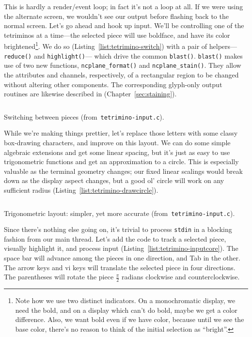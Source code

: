 This is hardly a render/event loop; in fact it's not a loop at all. If we were
using the alternate screen, we wouldn't see our output before flashing back to
the normal screen. Let's go ahead and hook up input. We'll be controlling one
of the tetriminos at a time---the selected piece will use boldface, and have its
color brightened\footnote{Note how we use two distinct indicators. On a monochromatic
display, we need the bold, and on a display which can't do bold, maybe we get a
color difference. Also, we want bold even if we have color, because until we
see the base color, there's no reason to think of the initial selection as
``bright''.}. We do so (Listing~\ref{list:tetrimino-switch}) with a pair of
helpers---\texttt{reduce()} and \texttt{highlight()}--- which drive the common
\texttt{blast()}. \texttt{blast()} makes use of two new functions,
\texttt{ncplane\_format()} and \texttt{ncplane\_stain()}. They allow the
attributes and channels, respectively, of a rectangular region to be changed
without altering other components. The corresponding glyph-only output routines
are likewise described in (Chapter~\ref{sec:staining}).

\begin{listing}[!htbp]
\inputminted[]{C}{code/tetrimino-switch.h}
\caption{Switching between pieces (from~\texttt{tetrimino-input.c}).}
\label{list:tetrimino-switch}
\end{listing}

While we're making things prettier, let's replace
those letters with some classy box-drawing characters, and improve on this
layout. We can do some simple algebraic extensions and get some linear spacing,
but it's just as easy to use trigonometric functions and get an approximation
to a circle. This is especially valuable as the terminal geometry changes; our
fixed linear scalings would break down as the display aspect changes, but a
good ol' circle will work on any sufficient radius
(Listing~\ref{list:tetrimino-drawcircle}).

\begin{listing}[!htbp]
\inputminted[]{C}{code/tetrimino-drawcircle.h}
\caption{Trigonometric layout: simpler, yet more accurate (from~\texttt{tetrimino-input.c}).}
\label{list:tetrimino-drawcircle}
\end{listing}

Since there's nothing else going on, it's trivial to process \texttt{stdin} in
a blocking fashion from our main thread. Let's add the code to track a selected
piece, visually highlight it, and process input (Listing~\ref{list:tetrimino-inputcore}).
The space bar will advance among the pieces in one direction,
and Tab in the other. The arrow keys and vi keys will translate the selected
piece in four directions. The parentheses will rotate the piece $\frac{\pi}{2}$ radians
clockwise and counterclockwise.

